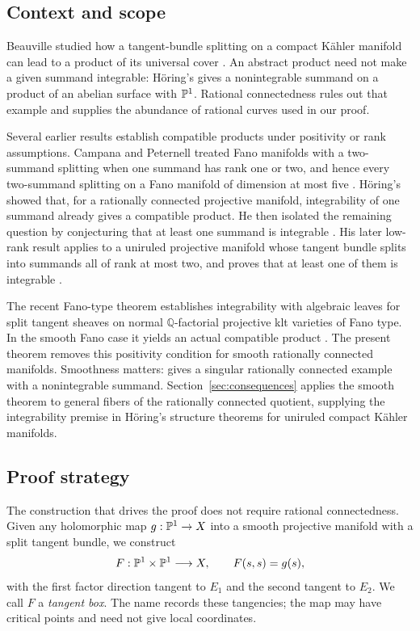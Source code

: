 \subsection*{Context and scope}

Beauville studied how a tangent-bundle splitting on a compact K\"ahler
manifold can lead to a product of its universal cover \cite{Bea00}.
An abstract product need not make a given summand integrable:
H\"oring's \cite[Example~2.14]{Hor07} gives a nonintegrable summand on
a product of an abelian surface with \(\mathbb P^1\). Rational connectedness
rules out that example and supplies the abundance of rational curves
used in our proof.

Several earlier results establish compatible products under positivity
or rank assumptions. Campana and Peternell treated Fano manifolds with
a two-summand splitting when one summand has rank one or two, and hence
every two-summand splitting on a Fano manifold of dimension at most five
\cite[Theorems~3.5--3.6 and Corollary~3.7]{CP02}. H\"oring's
\cite[Theorem~1.4]{Hor07} showed that, for a rationally connected
projective manifold, integrability of one summand already gives a
compatible product. He then isolated the remaining question by
conjecturing that at least one summand is integrable
\cite[Conjecture~1.2]{Hor08}. His later low-rank result applies to a
uniruled projective manifold whose tangent bundle splits into summands
all of rank at most two, and proves that at least one of them is
integrable \cite[Lemma~4.21]{Hor08}.

The recent Fano-type theorem \cite[Theorem~1.1]{Hor26} establishes
integrability with algebraic leaves for split tangent sheaves on normal
\(\mathbb Q\)-factorial projective klt varieties of Fano type. In the
smooth Fano case it yields an actual compatible product
\cite[Corollary~1.3]{Hor26}. The present theorem removes this positivity
condition for smooth rationally connected manifolds. Smoothness matters:
\cite[Example~4.3]{Hor26} gives a singular rationally connected example
with a nonintegrable summand. Section~\ref{sec:consequences} applies the
smooth theorem to general fibers of the rationally connected quotient,
supplying the integrability premise in H\"oring's structure theorems
for uniruled compact K\"ahler manifolds.

\subsection*{Proof strategy}

The construction that drives the proof does not require rational
connectedness. Given any holomorphic map \(g:\mathbb P^1\to X\) into a smooth
projective manifold with a split tangent bundle, we construct
\[
F:\mathbb P^1\times\mathbb P^1\longrightarrow X,\qquad F(s,s)=g(s),
\]
with the first factor direction tangent to \(E_1\) and the second
tangent to \(E_2\). We call \(F\) a \emph{tangent box}. The name records
these tangencies; the map may have critical points and need not give
local coordinates.

